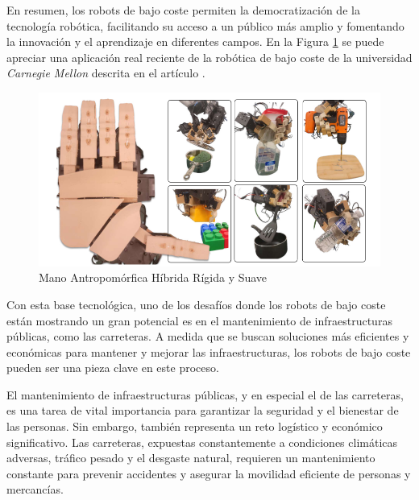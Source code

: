En resumen, los robots de bajo coste permiten la democratización de la tecnología robótica, facilitando su acceso a un público más amplio y fomentando la innovación y el aprendizaje en diferentes campos. En la Figura \ref{fig:roblowcost} se puede apreciar una aplicación real reciente de la robótica de bajo coste de la universidad \textit{Carnegie Mellon} descrita en el artículo \cite{shaw2024leap}.\\ 

\begin{figure} [h!]
	\begin{center}
		\includegraphics[width=16cm]{figs/handlowcost.png}
	\end{center}
	\caption{Mano Antropomórfica Híbrida Rígida y Suave} %
	\label{fig:roblowcost}
\end{figure}


Con esta base tecnológica, uno de los desafíos donde los robots de bajo coste están mostrando un gran potencial es en el mantenimiento de infraestructuras públicas, como las carreteras. A medida que se buscan soluciones más eficientes y económicas para mantener y mejorar las infraestructuras, los robots de bajo coste pueden ser una pieza clave en este proceso.

El mantenimiento de infraestructuras públicas, y en especial el de las carreteras, es una tarea de vital importancia para garantizar la seguridad y el bienestar de las personas. Sin embargo, también representa un reto logístico y económico significativo. Las carreteras, expuestas constantemente a condiciones climáticas adversas, tráfico pesado y el desgaste natural, requieren un mantenimiento constante para prevenir accidentes y asegurar la movilidad eficiente de personas y mercancías.

